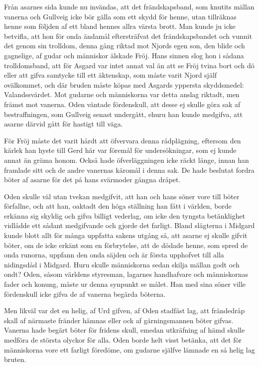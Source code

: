 Från asarnes sida kunde nu invändas, att det frändskapsband, som knutits
mällan vanerna och Gullveig icke bör gälla som ett skydd för henne, utan
tillräknas henne som följden af ett bland hennes allra värsta brott. Man
kunde ju icke betvifla, att hon för onda ändamål eftersträfvat det
frändskapsbandet och vunnit det genom sin trolldom, denna gång riktad
mot Njords egen son, den blide och gagnelige, af gudar och människor
älskade Fröj. Hans sinnen slog hon i sådana trolldomsband, att för
Asgard var intet annat val än att se Fröj tvina bort och dö eller att
gifva samtycke till ett äktenskap, som måste varit Njord själf
ovälkommet, och där bruden måste köpas med Asgards yppersta skyddsmedel:
Valandssvärdet. Mot gudarne och människorna var detta anslag riktadt,
men främst mot vanerna. Oden väntade fördenskull, att desse ej skulle
göra sak af bestraffningen, som Gullveig senast undergått, ehuru han
kunde medgifva, att asarne därvid gått för hastigt till väga.

För Fröj måste det varit hårdt att öfvervara denna rådplägning, eftersom
den kärlek han hyste till Gerd här var föremål för undersökningar, som
ej kunde annat än gräma honom. Också hade öfverläggningen icke räckt
länge, innan han framlade sitt och de andre vanernas käromål i denna
\protect\hypertarget{lb1625905.xhtmlux5cux23start142}{}{}\protect\hypertarget{lb1625905.xhtmlux5cux23start142-a}{}{}\protect\hypertarget{lb1625905.xhtmlux5cux23start142-b}{}{}\protect\hypertarget{lb1625905.xhtmlux5cux23start142-c}{}{}\protect\hypertarget{lb1625905.xhtmlux5cux23start142-d}{}{}
sak. De hade beslutat fordra böter af asarne för det på hans svärmoder
gångna dråpet.

Oden skulle väl utan tvekan medgifvit, att han och hans söner vore till
böter förfallne, och att han, oaktadt den höga ställning han fått i
världen, borde erkänna sig skyldig och gifva billigt vederlag, om icke
den tyngsta betänklighet vidlådde ett sådant medgifvande och gjorde det
farligt. Bland slägterna i Midgard kunde blott allt för många uppfatta
sakens utgång så, att asarne ej skulle gifvit böter, om de icke erkänt
som en förbrytelse, att de dödade henne, som spred de onda runorna,
uppfann den onda säjden och är första upphofvet till alla nidingsdåd i
Midgard. Huru skulle människorna sedan skilja mällan godt och ondt?
Oden, såsom världens styresman, lagarnes handhafvare och människornas
fader och konung, måste ur denna synpunkt se målet. Han med sina söner
ville fördenskull icke gifva de af vanerna begärda böterna.

Men likväl var det en helig, af Urd gifven, af Oden stadfäst lag, att
frändedråp skall af närmaste fränder hämnas eller ock af gärningsmannen
böter gifvas. Vanerna hade begärt böter för fridens skull, emedan
utkräfning af hämd skulle medföra de största olyckor för alla. Oden
borde helt visst betänka, att det för människorna vore ett farligt
föredöme, om gudarne själfve lämnade en så helig lag bruten.

